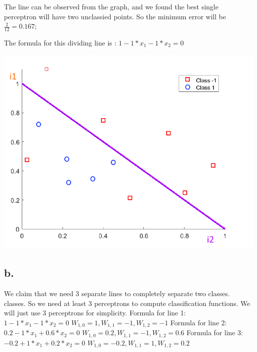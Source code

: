 \documentclass[12pt, letterpaper]{article}
\begin{document}
The line can be observed from the graph, and we found the best single perceptron will have two unclassied points. So the minimum error will be
$\frac{2}{12}= 0.167; $

The formula for this dividing line is : $1-1*x_{1}-1*x_{2}=0$

\includegraphics[scale=0.6]{"problem-5a"}

\subsection{b.}

We claim that we need 3 separate lines to completely separate two classes. classes. So we need at least 3 perceptrons
to compute classification functions. We will just use 3 perceptrons for simplicity.\newline
\newline
Formula for line 1:\newline
$1-1*x_{1}-1*x_{2}=0$\newline
$W_{1,0}=1,W_{1,1}=-1,W_{1,2}=-1$\newline
Formula for line 2:\newline
$0.2-1*x_{1}+0.6*x_{2}=0$\newline
$W_{1,0}=0.2,W_{1,1}=-1,W_{1,2}=0.6$\newline
Formula for line 3:\newline
$-0.2+1*x_{1}+0.2*x_{2}=0$\newline
$W_{1,0}=-0.2,W_{1,1}=1,W_{1,2}=0.2$\newline
\end{document}
